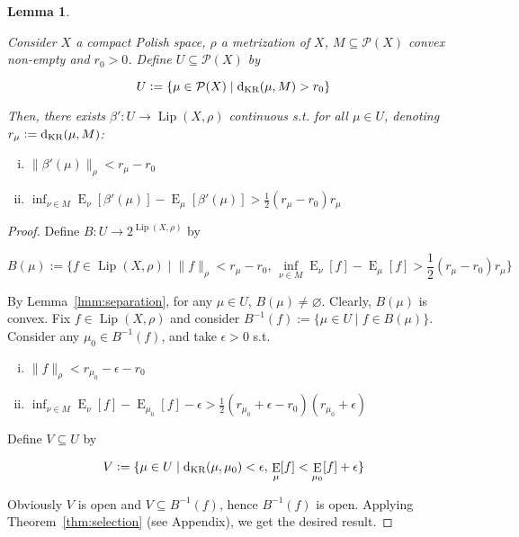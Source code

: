 \documentclass[11pt]{article}
\theoremstyle{definition}
\theoremstyle{plain}
\newtheorem{lemma}{Lemma}%
\newcommand{\N}[1]{\lVert #1 \rVert}
\DeclareMathOperator{\E}{E}
\newcommand{\PM}{\mathcal{P}}
\newcommand{\Lp}{{\operatorname{Lip}}}
\newcommand{\DKR}{\operatorname{d}_{\textnormal{KR}}}
\begin{document}
\begin{samepage}
\begin{lemma}
\label{lmm:savvy_outside}

Consider $X$ a compact Polish space, $\rho$ a metrization of $X$, $M \subseteq \PM(X)$ convex non-empty and $r_0 > 0$. Define $U \subseteq \PM(X)$ by

\begin{equation*}
U := \{\mu \in \PM(X) \mid \DKR(\mu,M) > r_0\}
\end{equation*}

Then, there exists $\beta': U \rightarrow \Lp(X,\rho)$ continuous s.t. for all $\mu \in U$, denoting $r_\mu:=\DKR(\mu,M)$:

\begin{enumerate}[i.]

\item $\N{\beta'(\mu)}_\rho < r_\mu - r_0$
\item $\inf_{\nu \in M} \E_\nu[\beta'(\mu)] - \E_\mu[\beta'(\mu)] > \frac{1}{2} (r_\mu - r_0) r_\mu$

\end{enumerate}

\end{lemma}
\end{samepage}

\begin{proof}

Define $B: U \rightarrow 2^{\Lp(X,\rho)}$ by

$$B(\mu):=\{f \in \Lp(X,\rho) \mid \N{f}_\rho < r_\mu - r_0,\, \inf_{\nu \in M} \E_\nu[f] - \E_\mu[f] > \frac{1}{2}(r_\mu - r_0) r_\mu\}$$

By Lemma~\ref{lmm:separation}, for any $\mu \in U$, $B(\mu) \ne \varnothing$. Clearly, $B(\mu)$ is convex. Fix $f \in \Lp(X,\rho)$ and consider $B^{-1}(f):=\{\mu \in U \mid f \in B(\mu)\}$. Consider any $\mu_0 \in B^{-1}(f)$, and take $\epsilon > 0$ s.t.

\begin{enumerate}[i.]

\item $\N{f}_\rho < r_{\mu_0}  - \epsilon - r_0$
\item $\inf_{\nu \in M} \E_\nu[f] - \E_{\mu_0}[f] -\epsilon > \frac{1}{2}(r_{\mu_0} + \epsilon  - r_0) (r_{\mu_0} + \epsilon)$

\end{enumerate}

Define $V \subseteq U$ by 

$$V := \{\mu \in U \mid \DKR(\mu,\mu_0) < \epsilon,\, \E_\mu[f] < \E_{\mu_0}[f] + \epsilon\}$$

Obviously $V$ is open and $V \subseteq B^{-1}(f)$, hence $B^{-1}(f)$ is open. Applying Theorem~\ref{thm:selection} (see Appendix), we get the desired result.
\end{proof}
\end{document}
